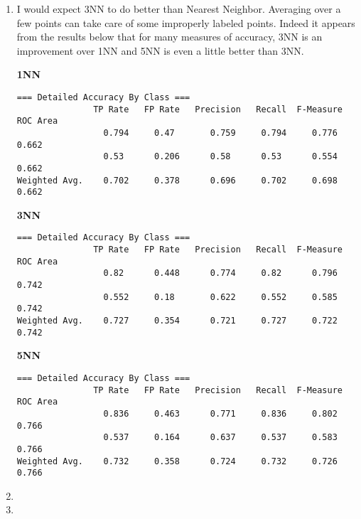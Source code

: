 \documentclass[12pt]{article}
\begin{document}
\begin{enumerate}
\begin{enumerate}
{\bf R=0.1}
\begin{verbatim}
                       Class
Variable     tested_negative
============================
preg                 -2.0877
plas                 -6.9767
pres                  1.6139
skin                 -0.0602
insu                  0.9985
mass                 -6.0008
pedi                 -2.2076
age                   -0.894
Intercept             7.9997
\end{verbatim}
{\bf R=0.0}
\begin{verbatim}
                       Class
Variable     tested_negative
============================
preg                 -2.0941
plas                 -6.9976
pres                  1.6221
skin                 -0.0613
insu                  1.0082
mass                 -6.0189
pedi                 -2.2136
age                  -0.8921
Intercept             8.0187
\end{verbatim}

\item %
I would expect 3NN to do better than Nearest Neighbor. Averaging over a few points can take care of some improperly labeled points. Indeed it appears from the results below that for many measures of accuracy, 3NN is an improvement over 1NN and 5NN is even a little better than 3NN.

{\bf 1NN}
\begin{verbatim}
=== Detailed Accuracy By Class ===
               TP Rate   FP Rate   Precision   Recall  F-Measure   ROC Area 
                 0.794     0.47       0.759     0.794     0.776      0.662  
                 0.53      0.206      0.58      0.53      0.554      0.662    
Weighted Avg.    0.702     0.378      0.696     0.702     0.698      0.662
\end{verbatim}

{\bf 3NN}
\begin{verbatim}
=== Detailed Accuracy By Class ===
               TP Rate   FP Rate   Precision   Recall  F-Measure   ROC Area 
                 0.82      0.448      0.774     0.82      0.796      0.742   
                 0.552     0.18       0.622     0.552     0.585      0.742   
Weighted Avg.    0.727     0.354      0.721     0.727     0.722      0.742
\end{verbatim}

{\bf 5NN}
\begin{verbatim}
=== Detailed Accuracy By Class ===
               TP Rate   FP Rate   Precision   Recall  F-Measure   ROC Area  
                 0.836     0.463      0.771     0.836     0.802      0.766    
                 0.537     0.164      0.637     0.537     0.583      0.766    
Weighted Avg.    0.732     0.358      0.724     0.732     0.726      0.766
\end{verbatim}

\item %

\item %

\end{enumerate}
\end{enumerate}
\end{document}
